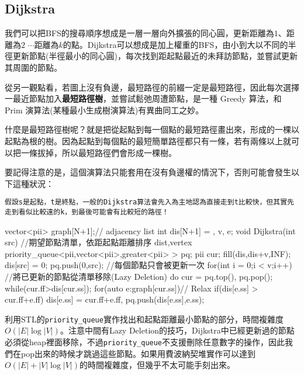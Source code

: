 \documentclass[main.tex]{subfiles}
\begin{document}
\subsection{Dijkstra}
我們可以把BFS的搜尋順序想成是一層一層向外擴張的同心圓，更新距離為$1$、距離為$2$ $\cdots$距離為$k$的點。Dijkstra可以想成是加上權重的BFS，由小到大以不同的半徑更新節點(半徑最小的同心圓)，每次找到距起點最近的未拜訪節點，並嘗試更新其周圍的節點。

從另一觀點看，若圖上沒有負邊，最短路徑的前綴一定是最短路徑，因此每次選擇一最近節點加入\textbf{最短路徑樹}，並嘗試鬆弛周遭節點，是一種 Greedy 算法，和 Prim 演算法(某種最小生成樹演算法)有異曲同工之妙。

什麼是最短路徑樹呢？就是把從起點到每一個點的最短路徑畫出來，形成的一棵以起點為根的樹。因為起點到每個點的最短簡單路徑都只有一條，若有兩條以上就可以把一條拔掉，所以最短路徑們會形成一棵樹。

要記得注意的是，這個演算法只能套用在沒有負邊權的情況下，否則可能會發生以下這種狀況：

\begin{center}
\end{center}

\texttt{假設s是起點，t是終點，一般的Dijkstra算法會先入為主地認為直接走到t比較快，但其實先走到看似比較遠的k，到最後可能會有比較短的路徑！}

\begin{C++}
vector<pii> graph[N+1];// adjacency list
int dis[N+1] = {}, v, e;
void Dijkstra(int src){
	//期望節點清單，依距起點距離排序 {dist,vertex}
	priority_queue<pii,vector<pii>,greater<pii> > pq;
	pii cur;
	fill(dis,dis+v,INF);
	dis[src] = 0;
	pq.push({0,src});
	//每個節點只會被更新一次
	for(int i = 0;i < v;i++){
		//將已更新的節點從清單移除(Lazy Deletion)
		do cur = pq.top(), pq.pop();
		while(cur.ff>dis[cur.ss]);
		for(auto e:graph[cur.ss])// Relax
			if(dis[e.ss] > cur.ff+e.ff)
				dis[e.ss] = cur.ff+e.ff,
			pq.push({dis[e.ss],e.ss});
	}
}
\end{C++}
利用STL的\texttt{priority\_queue}實作找出和起點距離最小節點的部分，時間複雜度$O(|E|\log|V|)$。注意中間有Lazy Deletion的技巧，Dijkstra中已經更新過的節點必須從heap裡面移除，不過\texttt{priority\_queue}不支援刪除任意數字的操作，因此我們在pop出來的時候才跳過這些節點。如果用費波納契堆實作可以達到$O(|E|+|V|\log|V|)$的時間複雜度，但幾乎不太可能手刻出來。
\end{document}
